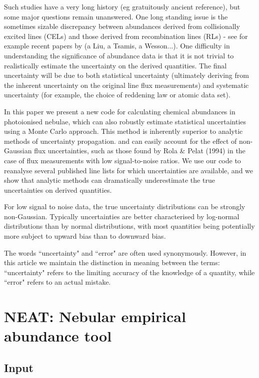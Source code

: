\documentclass[useAMS,usenatbib]{mn2e}
\begin{document}
Such studies have a very long history (eg gratuitously ancient reference), but some major questions remain unanswered.  One long standing issue is the sometimes sizable discrepancy between abundances derived from collisionally excited lines (CELs) and those derived from recombination lines (RLs) - see for example recent papers by (a Liu, a Tsamis, a Wesson...).  One difficulty in understanding the significance of abundance data is that it is not trivial to realistically estimate the uncertainty on the derived quantities.  The final uncertainty will be due to both statistical uncertainty (ultimately deriving from the inherent uncertainty on the original line flux measurements) and systematic uncertainty (for example, the choice of reddening law or atomic data set).

In this paper we present a new code for calculating chemical abundances in photoionised nebulae, which can also robustly estimate statistical uncertainties using a Monte Carlo approach.  This method is inherently superior to analytic methods of uncertainty propagation. and can easily account for the effect of non-Gaussian flux uncertainties, such as those found by Rola \& Pelat (1994) in the case of flux measurements with low signal-to-noise ratios.  We use our code to reanalyse several published line lists for which uncertainties are available, and we show that analytic methods can dramatically underestimate the true uncertainties on derived quantities.

For low signal to noise data, the true uncertainty distributions can be strongly non-Gaussian.  Typically uncertainties are better characterised by log-normal distributions than by normal distributions, with most quantities being potentially more subject to upward bias than to downward bias.

The words ``uncertainty" and ``error" are often used synonymously.  However, in this article we maintain the distinction in meaning between the terms: ``uncertainty" refers to the limiting accuracy of the knowledge of a quantity, while ``error" refers to an actual mistake.

\section{NEAT: Nebular empirical abundance tool}

\subsection{Input}
\end{document}
